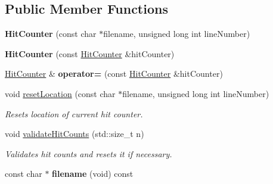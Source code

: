 \subsection*{Public Member Functions}
\begin{DoxyCompactItemize}
\item 
{\bfseries Hit\+Counter} (const char $\ast$filename, unsigned long int line\+Number)\hypertarget{classel_1_1base_1_1HitCounter_a1fe641f45123641012673f8bc29aefd8}{}\label{classel_1_1base_1_1HitCounter_a1fe641f45123641012673f8bc29aefd8}

\item 
{\bfseries Hit\+Counter} (const \hyperlink{classel_1_1base_1_1HitCounter}{Hit\+Counter} \&hit\+Counter)\hypertarget{classel_1_1base_1_1HitCounter_abae187cf5ea0f94e812223ee4be7061f}{}\label{classel_1_1base_1_1HitCounter_abae187cf5ea0f94e812223ee4be7061f}

\item 
\hyperlink{classel_1_1base_1_1HitCounter}{Hit\+Counter} \& {\bfseries operator=} (const \hyperlink{classel_1_1base_1_1HitCounter}{Hit\+Counter} \&hit\+Counter)\hypertarget{classel_1_1base_1_1HitCounter_ad32a5e5c2a63ff30fa9d298613d746d1}{}\label{classel_1_1base_1_1HitCounter_ad32a5e5c2a63ff30fa9d298613d746d1}

\item 
void \hyperlink{classel_1_1base_1_1HitCounter_af58479cb66b71a76a3f8fd26193bfde1}{reset\+Location} (const char $\ast$filename, unsigned long int line\+Number)\hypertarget{classel_1_1base_1_1HitCounter_af58479cb66b71a76a3f8fd26193bfde1}{}\label{classel_1_1base_1_1HitCounter_af58479cb66b71a76a3f8fd26193bfde1}

\begin{DoxyCompactList}\small\item\em Resets location of current hit counter. \end{DoxyCompactList}\item 
void \hyperlink{classel_1_1base_1_1HitCounter_a04dcca0a3f1b1f9a0ef8d812f00cecf0}{validate\+Hit\+Counts} (std\+::size\+\_\+t n)\hypertarget{classel_1_1base_1_1HitCounter_a04dcca0a3f1b1f9a0ef8d812f00cecf0}{}\label{classel_1_1base_1_1HitCounter_a04dcca0a3f1b1f9a0ef8d812f00cecf0}

\begin{DoxyCompactList}\small\item\em Validates hit counts and resets it if necessary. \end{DoxyCompactList}\item 
const char $\ast$ {\bfseries filename} (void) const \hypertarget{classel_1_1base_1_1HitCounter_ad04433d214c175775ed61453ead374fc}{}\label{classel_1_1base_1_1HitCounter_ad04433d214c175775ed61453ead374fc}


\end{DoxyCompactItemize}
